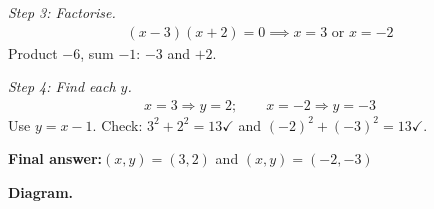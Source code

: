 \documentclass[11pt]{article}
\begin{document}
\textit{Step 3: Factorise.}
\[\begin{gathered}
(x - 3)(x + 2) = 0 \implies x = 3 \text{ or } x = -2
\end{gathered}\]
Product \( -6 \), sum \( -1 \): \( -3 \) and \( +2 \).

\textit{Step 4: Find each \( y \).}
\[\begin{gathered}
x = 3 \Rightarrow y = 2; \qquad x = -2 \Rightarrow y = -3
\end{gathered}\]
Use \( y = x - 1 \). Check: \( 3^2 + 2^2 = 13 \checkmark \) and \( (-2)^2 + (-3)^2 = 13 \checkmark \).

\begin{answerbox}
\textbf{Final answer:}\quad \(\displaystyle (x, y) = (3, 2)\) and \(\displaystyle (x, y) = (-2, -3)\)
\end{answerbox}
\textbf{Diagram.}
\end{document}
